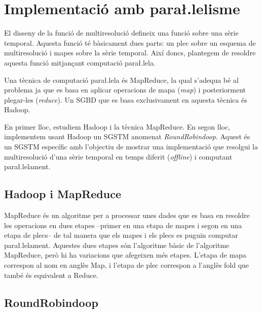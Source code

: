 \chapter{Implementació amb para\l.lelisme}


El disseny de la funció de multiresolució 
defineix una funció sobre una sèrie temporal. Aquesta funció té
bàsicament dues parts: un plec sobre un esquema de multiresolució i
mapes sobre la sèrie temporal. Així doncs, plantegem de resoldre
aquesta funció mitjançant computació para\l.lela. 


Una tècnica de computació para\l.lela és MapReduce, la qual s'adequa
bé al problema ja que es basa en aplicar operacions de mapa
(\emph{map}) i posteriorment plegar-les (\emph{reduce}). Un \gls{SGBD}
que es basa exclusivament en aquesta tècnica és Hadoop.


En primer lloc, estudiem Hadoop i la tècnica MapReduce.  En segon
lloc, implementem usant Hadoop un \gls{SGSTM} anomenat
\emph{RoundRobindoop}. Aquest és un \gls{SGSTM} específic amb
l'objectiu de mostrar una implementació que resolgui la multiresolució
d'una sèrie temporal en temps diferit (\emph{offline}) i computant
para\l.lelament.



\section{Hadoop i MapReduce}





MapReduce és un algoritme per a processar unes dades que es basa en
resoldre les operacions en dues etapes --primer en una etapa de mapes
i segon en una etapa de plecs-- de tal manera que els mapes i els
plecs es puguin computar para\l.lelament. Aquestes dues etapes són
l'algoritme bàsic de l'algoritme MapReduce, però hi ha variacions que
afegeixen més etapes.  L'etapa de mapa correspon al nom en anglès Map,
i l'etapa de plec correspon a l'anglès fold que també és equivalent a
Reduce.







\section{RoundRobindoop}






